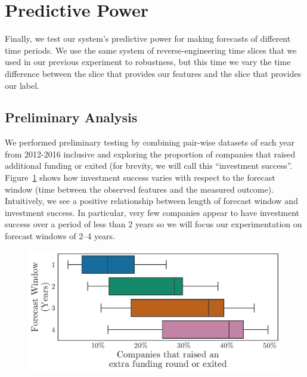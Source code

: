 \documentclass[../thesis/thesis.tex]{subfiles}
\begin{document}
\section{Predictive Power}

Finally, we test our system's predictive power for making forecasts of different time periods. We use the same system of reverse-engineering time slices that we used in our previous experiment to robustness, but this time we vary the time difference between the slice that provides our features and the slice that provides our label.

\subsection{Preliminary Analysis}

We performed preliminary testing by combining pair-wise datasets of each year from 2012-2016 inclusive and exploring the proportion of companies that raised additional funding or exited (for brevity, we will call this ``investment success''. Figure~\ref{fig:evaluation:outcome_forecast_window} shows how investment success varies with respect to the forecast window (time between the observed features and the measured outcome). Intuitively, we see a positive relationship between length of forecast window and investment success. In particular, very few companies appear to have investment success over a period of less than 2 years so we will focus our experimentation on forecast windows of 2--4 years.

\begin{figure}[!htb]
    \centering
    \includegraphics[width=\textwidth]{../figures/evaluation/outcome_forecast_window}
    \caption[Investment success by forecast window]{}
    \label{fig:evaluation:outcome_forecast_window}
\end{figure}
\end{document}
